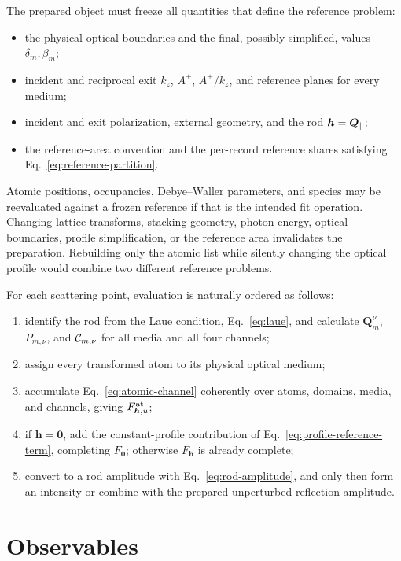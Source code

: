 The prepared object must freeze all quantities that define the reference
problem:
\begin{itemize}
  \item the physical optical boundaries and the final, possibly simplified,
        values $\delta_m,\beta_m$;
  \item incident and reciprocal exit $k_z$, $A^\pm$, $A^\pm/k_z$, and reference
        planes for every medium;
  \item incident and exit polarization, external geometry, and the rod
        $\bm h=\bm{Q}_{\parallel}$;
  \item the reference-area convention and the per-record reference shares
        satisfying Eq.~\eqref{eq:reference-partition}.
\end{itemize}
Atomic positions, occupancies, Debye--Waller parameters, and species may be
reevaluated against a frozen reference if that is the intended fit operation.
Changing lattice transforms, stacking geometry, photon energy, optical
boundaries, profile simplification, or the reference area invalidates the
preparation.  Rebuilding only the atomic list while silently changing the
optical profile would combine two different reference problems.

For each scattering point, evaluation is naturally ordered as follows:
\begin{enumerate}
  \item identify the rod from the Laue condition, Eq.~\eqref{eq:laue}, and
        calculate $\bm Q_m^\nu$, $P_{m,\nu}$, and $\mathcal C_{m,\nu}$ for all
        media and all four channels;
  \item assign every transformed atom to its physical optical medium;
  \item accumulate Eq.~\eqref{eq:atomic-channel} coherently over atoms,
        domains, media, and channels, giving $F_{\bm h,u}^{\rm at}$;
  \item if $\bm h=\bm 0$, add the constant-profile contribution of
        Eq.~\eqref{eq:profile-reference-term}, completing $F_{\bm 0}$;
        otherwise $F_{\bm h}$ is already complete;
  \item convert to a rod amplitude with Eq.~\eqref{eq:rod-amplitude}, and only
        then form an intensity or combine with the prepared unperturbed
        reflection amplitude.
\end{enumerate}

\section{Observables}

